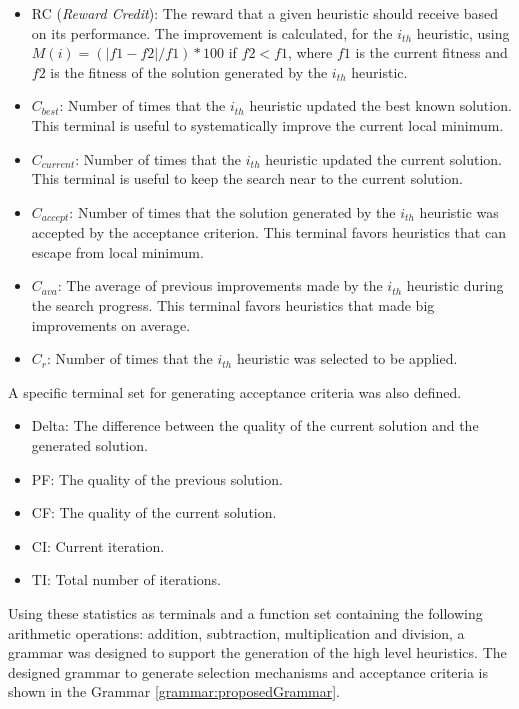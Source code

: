 \documentclass[conference]{IEEEtran}
\begin{document}
\begin{itemize}
	\item RC (\textit{Reward Credit}): The reward that a given heuristic should receive based on its performance. The improvement is calculated, for the $i_{th}$ heuristic, using $M(i) = (|f1 -f2|/f1)*100$ if $f2< f1$, where $f1$ is the current fitness and $f2$ is the fitness of the solution generated by the $i_{th}$ heuristic.
	
 	\item $C_{best}$: Number of times that the $i_{th}$ heuristic updated the best known solution. This terminal is useful to systematically improve the current local minimum.  

	\item $C_{current}$: Number of times that the $i_{th}$ heuristic updated the current solution. This terminal is useful to keep the search near to the current solution.

	\item $C_{accept}$: Number of times that the solution generated
	by the $i_{th}$ heuristic was accepted by the acceptance criterion. This terminal favors heuristics that can escape from local minimum.

	\item $C_{ava}$: The average of previous improvements made by the $i_{th}$ heuristic during the search progress. This terminal favors heuristics that made big improvements on average.
	\item $C_r$: Number of times that the $i_{th}$ heuristic was selected to be applied.
	
	\end{itemize} 

A specific terminal set for generating acceptance criteria was also defined.

 \begin{itemize}
 	 \item Delta: The difference between the quality of the current solution and the generated solution.
 	\item PF: The quality of the previous solution.
 	\item CF: The quality of the current solution.
 	\item CI: Current iteration.
 	\item TI: Total number of iterations.
 \end{itemize}
	 
  Using these statistics as terminals and a function set containing the following arithmetic operations: addition, subtraction, multiplication and division, a grammar was designed to support the generation of the high level heuristics. The designed grammar to generate selection mechanisms and acceptance criteria is shown in the Grammar \ref{grammar:proposedGrammar}.
  
\end{document}

